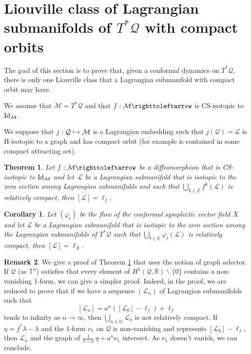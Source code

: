 \documentclass[JEP,XML,SOM,Unicode,published]{cedram}
\def\hto{\mathrel{\lhook\joinrel\to}}
\newtheorem{theorem}{Theorem}
\newtheorem{corollary}{Corollary}
\theoremstyle{definition}
\newtheorem{remark}[theorem]{Remark}
\def\R{\mathbb{R}}
\def\Z{\mathbb{Z}}
\def\N{\mathbb{N}}
\def\T{\mathbb{T}}
\def\cL{{\mathcal L}}
\def\cM{{\mathcal M}}
\def\cQ{{\mathcal Q}}
\begin{document}
\section{Liouville class of Lagrangian submanifolds of \texorpdfstring{$T^*\cQ$}{T*Q} with compact orbits}

The goal of this section is to prove that, given a conformal dynamics on $T^*\cQ$, there is only one Liouville class that a Lagrangian submanifold with compact orbit may have.

We assume that $\cM=T^*\cQ$ and that $f: \cM \righttoleftarrow$ is CS-isotopic to ${\rm Id}_\cM$.

We suppose that $j:\cQ\hto\cM$ is a Lagrangian embedding such that $j(\cQ)=\cL$ is H\nobreakdash-isotopic to a graph and has compact orbit (for example is contained in some compact attracting set).

\begin{theorem}\label{Tcompactexactdiff}
Let $f: \cM \righttoleftarrow$ be a diffeomorphism that is CS-isotopic to ${\rm Id}_\cM$ and let~$\cL$ be a Lagrangian submanifold that is isotopic to the zero section among Lagrangian submanifolds and such that $\bigcup_{k\in\Z}f^k(\cL)$ is relatively compact, then $[\cL]=\ell_f$.
\end{theorem}

\begin{corollary}
Let $(\varphi_t)$ be the flow of the conformal symplectic vector field $X$ and let $\cL$ be a { Lagrangian submanifold that is isotopic to the zero section among the Lagrangian submanifolds} of $T^*\cQ$ such that $\bigcup_{t\in\R}\varphi_t(\cL)$ is relatively compact, then $[\cL]=\ell_X$.
\end{corollary}

\begin{remark}
We give a proof of Theorem \ref{Tcompactexactdiff} that uses the notion of graph selector. If $\cQ$ (as $\T^n$) satisfies that every element of $H^1(\cQ, \R)\backslash\{ 0\}$ contains a non-vanishing $1$\nobreakdash-form, we can give a simpler proof. Indeed, in the proof, we are reduced to prove that if we have a sequence $(\cL_n)$ of Lagrangian submanifolds such that
\[
[ \cL_n]=a^n([\cL_0]-\ell_f)+\ell_f
\]
tends to infinity as $n \to \infty$, then $\bigcup_{n\in\N}\cL_n$ is not relatively compact. If $\eta=f^*\lambda-\lambda$ and the $1$-form $\nu_1$ on $\cQ$ is non-vanishing and represents $[\cL_0]-\ell_f$, then $\cL_n$ and the graph of $\frac{1}{1-a}\,\eta+a^n\nu_1$ intersect. As $\nu_1$ doesn't vanish, we can conclude.
\end{remark}
\end{document}
